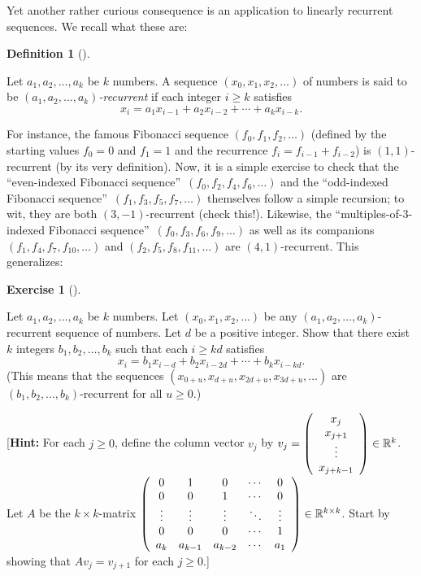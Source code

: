 \documentclass[numbers=enddot,12pt,final,onecolumn,notitlepage]{scrartcl}%
\newcounter{exer}
\numberwithin{exer}{subsection}
\theoremstyle{definition}
\newtheorem{defi}[theo]{Definition}
\newenvironment{definition}[1][]
{\begin{defi}[#1]\begin{leftbar}}
{\end{leftbar}\end{defi}}
\newtheorem{exmp}[exer]{Exercise}
\newenvironment{exercise}[1][]
{\begin{exmp}[#1]\begin{leftbar}}
{\end{leftbar}\end{exmp}}
\begin{document}
Yet another rather curious consequence is an application to linearly recurrent
sequences. We recall what these are:

\begin{definition}
Let $a_{1},a_{2},\ldots,a_{k}$ be $k$ numbers. A sequence $\left(  x_{0}%
,x_{1},x_{2},\ldots\right)  $ of numbers is said to be $\left(  a_{1}%
,a_{2},\ldots,a_{k}\right)  $\emph{-recurrent} if each integer $i\geq k$
satisfies%
\[
x_{i}=a_{1}x_{i-1}+a_{2}x_{i-2}+\cdots+a_{k}x_{i-k}.
\]

\end{definition}

For instance, the famous Fibonacci sequence $\left(  f_{0},f_{1},f_{2}%
,\ldots\right)  $ (defined by the starting values $f_{0}=0$ and $f_{1}=1$ and
the recurrence $f_{i}=f_{i-1}+f_{i-2}$) is $\left(  1,1\right)  $-recurrent
(by its very definition). Now, it is a simple exercise to check that the
\textquotedblleft even-indexed Fibonacci sequence\textquotedblright\ $\left(
f_{0},f_{2},f_{4},f_{6},\ldots\right)  $ and the \textquotedblleft odd-indexed
Fibonacci sequence\textquotedblright\ $\left(  f_{1},f_{3},f_{5},f_{7}%
,\ldots\right)  $ themselves follow a simple recursion; to wit, they are both
$\left(  3,-1\right)  $-recurrent (check this!). Likewise, the
\textquotedblleft multiples-of-$3$-indexed Fibonacci
sequence\textquotedblright\ $\left(  f_{0},f_{3},f_{6},f_{9},\ldots\right)  $
as well as its companions $\left(  f_{1},f_{4},f_{7},f_{10},\ldots\right)  $
and $\left(  f_{2},f_{5},f_{8},f_{11},\ldots\right)  $ are $\left(
4,1\right)  $-recurrent. This generalizes:

\begin{exercise}
 Let $a_{1},a_{2},\ldots,a_{k}$ be $k$ numbers. Let $\left(
x_{0},x_{1},x_{2},\ldots\right)  $ be any $\left(  a_{1},a_{2},\ldots
,a_{k}\right)  $-recurrent sequence of numbers. Let $d$ be a positive integer.
Show that there exist $k$ integers $b_{1},b_{2},\ldots,b_{k}$ such that each
$i\geq kd$ satisfies%
\[
x_{i}=b_{1}x_{i-d}+b_{2}x_{i-2d}+\cdots+b_{k}x_{i-kd}.
\]
(This means that the sequences $\left(  x_{0+u},x_{d+u},x_{2d+u}%
,x_{3d+u},\ldots\right)  $ are $\left(  b_{1},b_{2},\ldots,b_{k}\right)
$-recurrent for all $u\geq0$.)

[\textbf{Hint:} For each $j\geq0$, define the column vector $v_{j}$ by
$v_{j}=\left(
\begin{array}
[c]{c}%
x_{j}\\
x_{j+1}\\
\vdots\\
x_{j+k-1}%
\end{array}
\right)  \in\mathbb{R}^{k}$. Let $A$ be the $k\times k$-matrix $\left(
\begin{array}
[c]{ccccc}%
0 & 1 & 0 & \cdots & 0\\
0 & 0 & 1 & \cdots & 0\\
\vdots & \vdots & \vdots & \ddots & \vdots\\
0 & 0 & 0 & \cdots & 1\\
a_{k} & a_{k-1} & a_{k-2} & \cdots & a_{1}%
\end{array}
\right)  \in\mathbb{R}^{k\times k}$. Start by showing that $Av_{j}=v_{j+1}$
for each $j\geq0$.]
\end{exercise}
\end{document}
